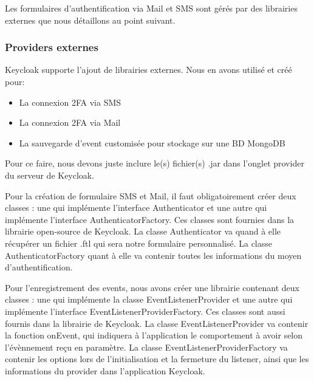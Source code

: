 Les formulaires d'authentification via Mail et SMS sont gérés par des librairies externes que nous
détaillons au point suivant.

\subsubsection{Providers externes}

Keycloak supporte l'ajout de librairies externes. Nous en avons utilisé et créé pour:

\begin{itemize}
    \item La connexion 2FA via SMS
    \item La connexion 2FA via Mail
    \item La sauvegarde d'event customisée pour stockage sur une BD MongoDB
\end{itemize}

Pour ce faire, nous devons juste inclure le(s) fichier(s) .jar dans l'onglet provider du serveur de
Keycloak.

Pour la création de formulaire SMS et Mail, il faut obligatoirement créer deux classes : une qui
implémente l'interface Authenticator et une autre qui implémente l'interface AuthenticatorFactory.
Ces classes sont fournies dans la librairie open-source de Keycloak. La classe Authenticator va quand
à elle récupérer un fichier .ftl qui sera notre formulaire personnalisé. La classe AuthenticatorFactory
quant à elle va contenir toutes les informations du moyen d'authentification.

Pour l'enregistrement des events, nous avons créer une librairie contenant deux classes : une qui
implémente la classe EventListenerProvider et une autre qui implémente l'interface
EventListenerProviderFactory. Ces classes sont aussi fournis dans la librairie de Keycloak. La classe
EventListenerProvider va contenir la fonction onEvent, qui indiquera à l'application le comportement
à avoir selon l'évènnement reçu en paramètre. La classe EventListenerProviderFactory va contenir les
options lors de l'initialisation et la fermeture du listener, ainsi que les informations du provider dans
l'application Keycloak.
